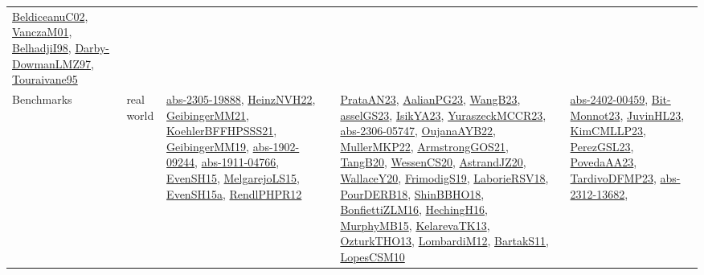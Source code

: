 {\begin{longtable}{llp{6cm}p{6cm}p{6cm}}
\href{papers/BeldiceanuC02.pdf}{BeldiceanuC02}\cite{BeldiceanuC02}, \href{papers/VanczaM01.pdf}{VanczaM01}\cite{VanczaM01}, \href{articles/BelhadjiI98.pdf}{BelhadjiI98}\cite{BelhadjiI98}, \href{articles/Darby-DowmanLMZ97.pdf}{Darby-DowmanLMZ97}\cite{Darby-DowmanLMZ97}, \href{papers/Touraivane95.pdf}{Touraivane95}\cite{Touraivane95}\\
Benchmarks & real world & \href{articles/abs-2305-19888.pdf}{abs-2305-19888}\cite{abs-2305-19888}, \href{articles/HeinzNVH22.pdf}{HeinzNVH22}\cite{HeinzNVH22}, \href{papers/GeibingerMM21.pdf}{GeibingerMM21}\cite{GeibingerMM21}, \href{articles/KoehlerBFFHPSSS21.pdf}{KoehlerBFFHPSSS21}\cite{KoehlerBFFHPSSS21}, \href{papers/GeibingerMM19.pdf}{GeibingerMM19}\cite{GeibingerMM19}, \href{articles/abs-1902-09244.pdf}{abs-1902-09244}\cite{abs-1902-09244}, \href{articles/abs-1911-04766.pdf}{abs-1911-04766}\cite{abs-1911-04766}, \href{papers/EvenSH15.pdf}{EvenSH15}\cite{EvenSH15}, \href{papers/MelgarejoLS15.pdf}{MelgarejoLS15}\cite{MelgarejoLS15}, \href{articles/EvenSH15a.pdf}{EvenSH15a}\cite{EvenSH15a}, \href{papers/RendlPHPR12.pdf}{RendlPHPR12}\cite{RendlPHPR12} & \href{articles/PrataAN23.pdf}{PrataAN23}\cite{PrataAN23}, \href{papers/AalianPG23.pdf}{AalianPG23}\cite{AalianPG23}, \href{papers/WangB23.pdf}{WangB23}\cite{WangB23}, \href{papers/asselGS23.pdf}{asselGS23}\cite{asselGS23}, \href{articles/IsikYA23.pdf}{IsikYA23}\cite{IsikYA23}, \href{articles/YuraszeckMCCR23.pdf}{YuraszeckMCCR23}\cite{YuraszeckMCCR23}, \href{articles/abs-2306-05747.pdf}{abs-2306-05747}\cite{abs-2306-05747}, \href{papers/OujanaAYB22.pdf}{OujanaAYB22}\cite{OujanaAYB22}, \href{articles/MullerMKP22.pdf}{MullerMKP22}\cite{MullerMKP22}, \href{papers/ArmstrongGOS21.pdf}{ArmstrongGOS21}\cite{ArmstrongGOS21}, \href{papers/TangB20.pdf}{TangB20}\cite{TangB20}, \href{papers/WessenCS20.pdf}{WessenCS20}\cite{WessenCS20}, \href{articles/AstrandJZ20.pdf}{AstrandJZ20}\cite{AstrandJZ20}, \href{articles/WallaceY20.pdf}{WallaceY20}\cite{WallaceY20}, \href{papers/FrimodigS19.pdf}{FrimodigS19}\cite{FrimodigS19}, \href{articles/LaborieRSV18.pdf}{LaborieRSV18}\cite{LaborieRSV18}, \href{articles/PourDERB18.pdf}{PourDERB18}\cite{PourDERB18}, \href{articles/ShinBBHO18.pdf}{ShinBBHO18}\cite{ShinBBHO18}, \href{papers/BonfiettiZLM16.pdf}{BonfiettiZLM16}\cite{BonfiettiZLM16}, \href{papers/HechingH16.pdf}{HechingH16}\cite{HechingH16}, \href{papers/MurphyMB15.pdf}{MurphyMB15}\cite{MurphyMB15}, \href{papers/KelarevaTK13.pdf}{KelarevaTK13}\cite{KelarevaTK13}, \href{articles/OzturkTHO13.pdf}{OzturkTHO13}\cite{OzturkTHO13}, \href{articles/LombardiM12.pdf}{LombardiM12}\cite{LombardiM12}, \href{articles/BartakS11.pdf}{BartakS11}\cite{BartakS11}, \href{articles/LopesCSM10.pdf}{LopesCSM10}\cite{LopesCSM10} & \href{articles/abs-2402-00459.pdf}{abs-2402-00459}\cite{abs-2402-00459}, \href{papers/Bit-Monnot23.pdf}{Bit-Monnot23}\cite{Bit-Monnot23}, \href{papers/JuvinHL23.pdf}{JuvinHL23}\cite{JuvinHL23}, \href{papers/KimCMLLP23.pdf}{KimCMLLP23}\cite{KimCMLLP23}, \href{papers/PerezGSL23.pdf}{PerezGSL23}\cite{PerezGSL23}, \href{papers/PovedaAA23.pdf}{PovedaAA23}\cite{PovedaAA23}, \href{papers/TardivoDFMP23.pdf}{TardivoDFMP23}\cite{TardivoDFMP23}, \href{articles/abs-2312-13682.pdf}{abs-2312-13682}\cite{abs-2312-13682}, 
\end{longtable}}
